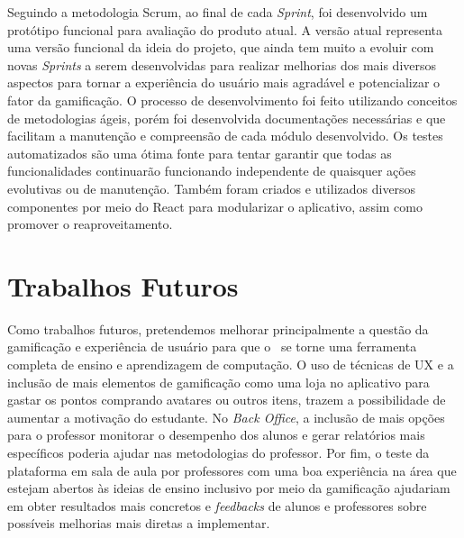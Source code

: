 
Seguindo a metodologia Scrum, ao final de cada \textit{Sprint}, foi desenvolvido um protótipo funcional para avaliação do produto atual. A versão atual representa uma versão funcional da ideia do projeto, que ainda tem muito a evoluir com novas \textit{Sprints} a serem desenvolvidas para realizar melhorias dos mais diversos aspectos para tornar a experiência do usuário mais agradável e potencializar o fator da gamificação. O processo de desenvolvimento foi feito utilizando conceitos de metodologias ágeis, porém foi desenvolvida documentações necessárias e que facilitam a manutenção e compreensão de cada módulo desenvolvido. Os testes automatizados \cite{tdd} são uma ótima fonte para tentar garantir que todas as funcionalidades continuarão funcionando independente de quaisquer ações evolutivas ou de manutenção. Também foram criados e utilizados diversos componentes por meio do React para modularizar o aplicativo, assim como promover o reaproveitamento.

\section{Trabalhos Futuros}

Como trabalhos futuros, pretendemos melhorar principalmente a questão da gamificação e experiência de usuário para que o \appName\ se torne uma ferramenta completa de ensino e aprendizagem de computação. O uso de técnicas de UX \cite{ux} e a inclusão de mais elementos de gamificação \cite{gamification_motivates} como uma loja no aplicativo para gastar os pontos comprando avatares ou outros itens, trazem a possibilidade de aumentar a motivação do estudante. No \textit{Back Office}, a inclusão de mais opções para o professor monitorar o desempenho dos alunos e gerar relatórios mais específicos poderia ajudar nas metodologias do professor.
Por fim, o teste da plataforma em sala de aula por professores com uma boa experiência na área que estejam abertos às ideias de ensino inclusivo por meio da gamificação ajudariam em obter resultados mais concretos e \textit{feedbacks} de alunos e professores sobre possíveis melhorias mais diretas a implementar.
